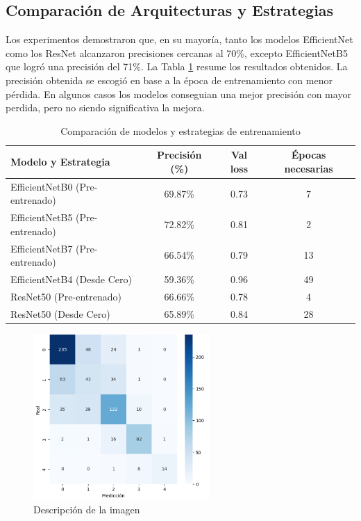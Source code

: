 \documentclass[11pt,spanish,listoffigures,listoftables]{tfgetsinf}
\begin{document}
\subsection{Comparación de Arquitecturas y Estrategias}
Los experimentos demostraron que, en su mayoría, tanto los modelos EfficientNet como los ResNet alcanzaron precisiones cercanas al 70\%, excepto EfficientNetB5 que logró una precisión del 71\%. La Tabla \ref{tab:resultados_experimentos} resume los resultados obtenidos.
La precisión obtenida se escogió en base a la época de entrenamiento con menor pérdida. En algunos casos los modelos conseguian una mejor precisión con mayor perdida, pero no siendo significativa la mejora.
\begin{table}[htbp]
\centering
\begin{tabular}{lccc}
\toprule
\textbf{Modelo y Estrategia} & \textbf{Precisión (\%)} & \textbf{Val loss} & \textbf{Épocas necesarias} \\
\midrule
EfficientNetB0 (Pre-entrenado)  & 69.87\%    & 0.73 & 7 \\
EfficientNetB5 (Pre-entrenado)  & 72.82\%    & 0.81 & 2 \\
EfficientNetB7 (Pre-entrenado)  & 66.54\%    & 0.79 & 13 \\
EfficientNetB4 (Desde Cero)     & 59.36\%    & 0.96 & 49 \\
ResNet50 (Pre-entrenado)        & 66.66\%    & 0.78 & 4 \\
ResNet50 (Desde Cero)           & 65.89\%    & 0.84 & 28 \\

\bottomrule
\end{tabular}
\caption{Comparación de modelos y estrategias de entrenamiento}
\label{tab:resultados_experimentos}
\end{table}

\begin{figure}[htbp]
    \centering
    \includegraphics[width=0.6\textwidth]{EfficientNet_B7.png}
    \caption{Descripción de la imagen}
    \label{fig:matriz_confusion}
\end{figure}
\end{document}
